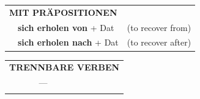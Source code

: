 \documentclass[10pt,a4paper]{revtex4-2}
\begin{document}
\begin{verbbox}
\vspace{10pt}

\begin{tabular}{lll}
\multicolumn{3}{l}{\textbf{MIT PRÄPOSITIONEN}}\\
& \textbf{sich erholen von} + Dat & (to recover from)\\
& \textbf{sich erholen nach} + Dat & (to recover after)\\
\end{tabular}
\hfill
\begin{tabular}{lll}
\multicolumn{3}{l}{\textbf{TRENNBARE VERBEN}}\\
& ---\\
\vspace{10pt}
\end{tabular}

\vspace{-5pt}

\end{verbbox}
\end{document}
